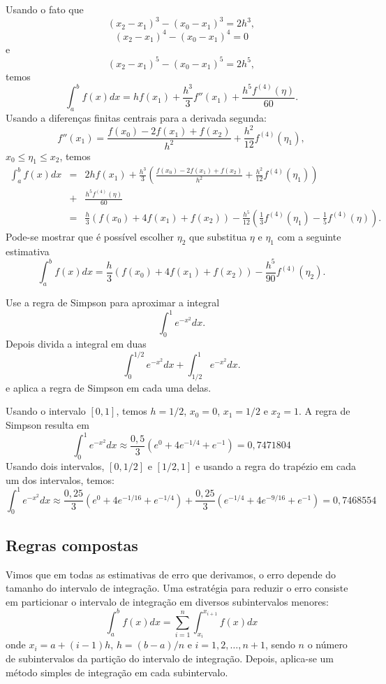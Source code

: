 Usando o fato que
$$
(x_2-x_1)^3-(x_0-x_1)^3=2h^3,
$$
$$
(x_2-x_1)^4-(x_0-x_1)^4=0
$$
e
$$
(x_2-x_1)^5-(x_0-x_1)^5=2h^5,
$$
temos
$$
\int_a^bf(x)dx=hf(x_1)+\frac{h^3}{3}f''(x_1)+\frac{h^5f^{(4)}(\eta)}{60}.
$$
Usando a diferenças finitas centrais para a derivada segunda:
$$
f''(x_1)=\frac{f(x_0)-2f(x_1)+f(x_2)}{h^2}+\frac{h^2}{12}f^{(4)}(\eta_1),
$$
$x_0\leq \eta_1\leq x_2$, temos
\begin{eqnarray*}
\int_a^bf(x)dx&=&2hf(x_1)+\frac{h^3}{3}\left(\frac{f(x_0)-2f(x_1)+f(x_2)}{h^2}+\frac{h^2}{12}f^{(4)}(\eta_1)\right)\\
&+&\frac{h^5f^{(4)}(\eta)}{60}\\
&=&\frac{h}{3}\left(f(x_0)+4f(x_1)+f(x_2)\right)-\frac{h^5}{12}\left(\frac{1}{3}f^{(4)}(\eta_1)-\frac{1}{5}f^{(4)}(\eta)\right).
\end{eqnarray*}
Pode-se mostrar que é possível escolher $\eta_2$ que substitua $\eta$ e $\eta_1$ com a seguinte estimativa
$$
\int_a^bf(x)dx=\frac{h}{3}\left(f(x_0)+4f(x_1)+f(x_2)\right)-\frac{h^5}{90}f^{(4)}(\eta_2).
$$

\begin{ex}
Use a regra de Simpson para aproximar a integral
$$
\int_0^1e^{-x^2}dx.
$$
Depois divida a integral em duas
$$
\int_0^{1/2}e^{-x^2}dx+\int_{1/2}^{1}e^{-x^2}dx.
$$
e aplica a regra de Simpson em cada uma delas.
\end{ex}
Usando o intervalo $[0,1]$, temos $h=1/2$, $x_0=0$, $x_1=1/2$ e $x_2=1$. A regra de Simpson resulta em
$$
\int_0^1e^{-x^2}dx\approx \frac{0,5}{3}(e^{0}+4e^{-1/4}+e^{-1})=0,7471804
$$
Usando dois intervalos, $[0,1/2]$ e $[1/2,1]$ e usando a regra do trapézio em cada um dos intervalos, temos:
$$
\int_0^1e^{-x^2}dx\approx \frac{0,25}{3}(e^{0}+4e^{-1/16}+e^{-1/4})+\frac{0,25}{3}(e^{-1/4}+4e^{-9/16}+e^{-1})=0,7468554
$$

\subsection{Regras compostas}

Vimos que em todas as estimativas de erro que derivamos, o erro depende do tamanho do intervalo de integração. Uma estratégia para reduzir o erro consiste em particionar o intervalo de integração em diversos subintervalos menores:
\begin{equation*}
\int_{a}^b f(x)dx=\sum_{i=1}^{n} \int_{x_i}^{x_{i+1}} f(x)dx  
\end{equation*}
onde $x_i = a + (i-1)h$, $h = (b-a)/n$ e $i = 1,2,\dotsc,n+1$, sendo $n$ o número de subintervalos da partição do intervalo de integração. Depois, aplica-se um método simples de integração em cada subintervalo.

